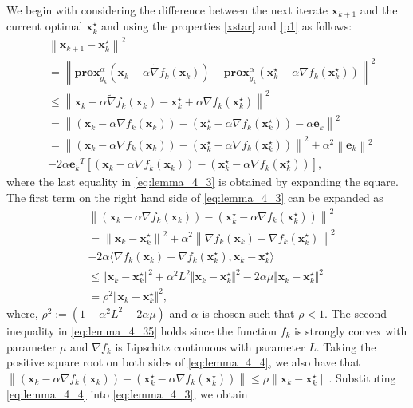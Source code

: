 \documentclass[draftcls,onecolumn,12pt]{IEEEtran}
\theoremstyle{plain}
\def\x{\mathbf{x}}
\def\e{\mathbf{e}}
\def\xks{\x_k^\star}
\def \nt {\tilde{\nabla}}
\def\prox{\textbf{prox}}
\providecommand{\norm}[1]{\left\|#1\right\|}
\providecommand{\ip}[1]{\langle#1\rangle}
\providecommand{\pk}[1]{\prox_{g_k}^\alpha\!\!\left(#1\right)}
\theoremstyle{plain}
\theoremstyle{remark}
\begin{document}
\begin{IEEEproof}
We begin with considering the difference between the next iterate $\x_{k+1}$ and the current optimal $\xks$ and using the properties \eqref{xstar} and \eqref{p1} as follows:
\begin{align}
&\norm{\x_{k+1}-\xks}^2 \nonumber\\
&=\norm{\pk{\x_k-\alpha\nt f_k(\x_k)} - \pk{\xks-\alpha\nabla f_k(\xks)}}^2  \nonumber\\
&\leq\norm{\x_k-\alpha\nt f_k(\x_k) - \xks + \alpha\nabla f_k(\xks)}^2 \label{eq:lemma_4_1}\\
&= \norm{(\x_k-\alpha\nabla f_k(\x_k)) - (\xks-\alpha\nabla f_k(\xks)) - \alpha\e_k}^2\label{eq:lemma_4_2}  \\
&= \norm{(\x_k-\alpha\nabla f_k(\x_k)) - (\xks-\alpha\nabla f_k(\xks))}^2 + \alpha^2\norm{\e_k}^2 \nonumber\\
&-2\alpha{\e_k}^{T}{[(\x_k-\alpha\nabla f_k(\x_k)) - (\xks-\alpha\nabla f_k(\xks))]},\label{eq:lemma_4_3} 
\end{align}
where the last equality in \eqref{eq:lemma_4_3} is obtained by expanding the square. The first term on the right hand side of \eqref{eq:lemma_4_3} can be expanded as 
\begin{align}	  		  
&\norm{(\x_k-\alpha\nabla f_k(\x_k)) - (\xks-\alpha\nabla f_k(\xks))}^2 \nonumber\\
&= \norm{\x_k-\xks}^2 + \alpha^2\norm{\nabla f_k(\x_k) - \nabla f_k(\xks)}^2 \nonumber\\
& - 2\alpha \ip{\nabla f_k(\x_k) - \nabla f_k(\xks), \x_k-\xks} \nonumber\\
&\leq  \Vert {\x}_{k} - \xks \Vert^{2} + \alpha^{2} L^{2} \Vert {\x}_{k} - \xks \Vert^{2} - 2 \alpha \mu \Vert {\x}_{k} - \xks \Vert^{2}  \label{eq:lemma_4_35} \\
 &=   \rho^2 \Vert {\x}_{k} - \xks \Vert^{2} \label{eq:lemma_4_4} ,
	  	\end{align}
	  				where, $\rho^2:=(1 + \alpha^{2}L^{2} - 2 \alpha\mu )$ and $\alpha$ is chosen such that $\rho<1$. The second inequality in \eqref{eq:lemma_4_35} holds since the function $f_k$ is strongly convex with parameter $\mu$ and $\nabla f_k$ is Lipschitz continuous with parameter $L$. Taking the positive square root on both sides of \eqref{eq:lemma_4_4}, we also have that $\norm{(\x_k-\alpha\nabla f_k(\x_k)) - (\xks-\alpha\nabla f_k(\xks))} \leq \rho \norm{\x_k-\xks}$. Substituting \eqref{eq:lemma_4_4} into \eqref{eq:lemma_4_3}, we obtain 	  				
	  				\begin{align}

\end{align}
\end{IEEEproof}
\end{document}
